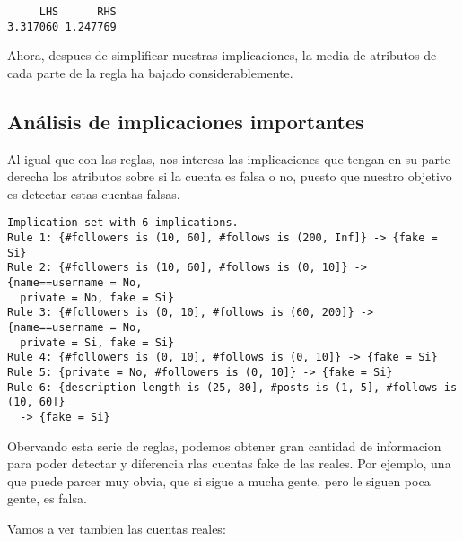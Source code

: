 \documentclass[
  letterpaper,
  DIV=11,
  numbers=noendperiod]{scrreprt}
\newenvironment{Shaded}{\begin{snugshade}}{\end{snugshade}}
\newcommand{\AttributeTok}[1]{\textcolor[rgb]{0.40,0.45,0.13}{#1}}
\newcommand{\FunctionTok}[1]{\textcolor[rgb]{0.28,0.35,0.67}{#1}}
\newcommand{\NormalTok}[1]{\textcolor[rgb]{0.00,0.23,0.31}{#1}}
\newcommand{\SpecialCharTok}[1]{\textcolor[rgb]{0.37,0.37,0.37}{#1}}
\newcommand{\StringTok}[1]{\textcolor[rgb]{0.13,0.47,0.30}{#1}}
\begin{document}
\begin{verbatim}
     LHS      RHS 
3.317060 1.247769 
\end{verbatim}

Ahora, despues de simplificar nuestras implicaciones, la media de
atributos de cada parte de la regla ha bajado considerablemente.

\subsection{Análisis de implicaciones
importantes}\label{anuxe1lisis-de-implicaciones-importantes}

Al igual que con las reglas, nos interesa las implicaciones que tengan
en su parte derecha los atributos sobre si la cuenta es falsa o no,
puesto que nuestro objetivo es detectar estas cuentas falsas.

\begin{Shaded}
\end{Shaded}

\begin{verbatim}
Implication set with 6 implications.
Rule 1: {#followers is (10, 60], #follows is (200, Inf]} -> {fake = Si}
Rule 2: {#followers is (10, 60], #follows is (0, 10]} -> {name==username = No,
  private = No, fake = Si}
Rule 3: {#followers is (0, 10], #follows is (60, 200]} -> {name==username = No,
  private = Si, fake = Si}
Rule 4: {#followers is (0, 10], #follows is (0, 10]} -> {fake = Si}
Rule 5: {private = No, #followers is (0, 10]} -> {fake = Si}
Rule 6: {description length is (25, 80], #posts is (1, 5], #follows is (10, 60]}
  -> {fake = Si}
\end{verbatim}

Obervando esta serie de reglas, podemos obtener gran cantidad de
informacion para poder detectar y diferencia rlas cuentas fake de las
reales. Por ejemplo, una que puede parcer muy obvia, que si sigue a
mucha gente, pero le siguen poca gente, es falsa.

Vamos a ver tambien las cuentas reales:

\begin{Shaded}
\end{Shaded}
\end{document}
